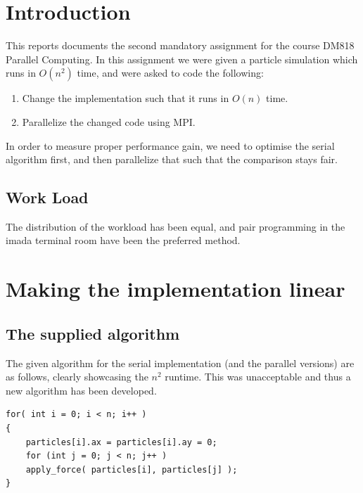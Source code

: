 \documentclass[a4paper,11pt,oneside]{book}
\begin{document}
\pagestyle{ruled}
\chapter{Introduction}
\setcounter{section}{1}
This reports documents the second mandatory assignment for the course DM818 Parallel Computing. In this assignment we were given a particle simulation which runs in $O(n^{2})$ time, and were asked to code the following:

\begin{enumerate}
\item Change the implementation such that it runs in $O(n)$ time.
\item Parallelize the changed code using MPI.
\end{enumerate}

In order to measure proper performance gain, we need to optimise the serial algorithm first, and then parallelize that such that the comparison stays fair.
 
\section{Work Load}
The distribution of the workload has been equal, and pair programming in the imada terminal room have been the preferred method.

\chapter{Making the implementation linear}
\section{The supplied algorithm}
The given algorithm for the serial implementation (and the parallel versions) are as follows, clearly showcasing the $n^{2}$ runtime. This was unacceptable and thus a new algorithm has been developed.

\begin{verbatim}
for( int i = 0; i < n; i++ )
{
	particles[i].ax = particles[i].ay = 0;
	for (int j = 0; j < n; j++ )
    apply_force( particles[i], particles[j] );
}
\end{verbatim}
\end{document}

